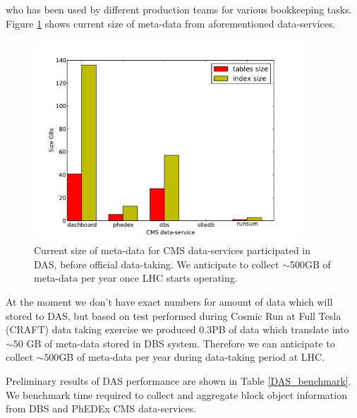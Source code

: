 \documentclass[a4paper]{jpconf}
\begin{document}
who has been used by different production teams for various bookkeeping tasks.
Figure \ref{db_size} shows current size of meta-data from aforementioned data-services.
\begin{figure}[htb]
\centering
\includegraphics[width=100mm]{db_size.pdf}
\caption{
Current size of meta-data for CMS data-services participated in DAS, before
official data-taking. We anticipate to collect $\sim$500GB of meta-data
per year once LHC starts operating.
}
\label{db_size}
\end{figure}

At the moment we don't have exact numbers for amount of data which will stored to DAS,
but based on test performed during 
Cosmic Run at Full Tesla (CRAFT) data taking \cite{CRAFT09}
exercise we produced 0.3PB of data which
translate into $\sim50$ GB of meta-data stored in DBS system. Therefore
we can anticipate to collect $\sim500$GB of meta-data per year during data-taking period
at LHC.

Preliminary results of DAS performance are shown in Table \ref{DAS_benchmark}.
We benchmark time required to collect and aggregate block object information
from DBS and PhEDEx CMS data-services.
\end{document}
